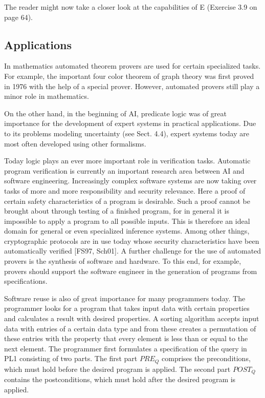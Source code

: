 \documentclass[10pt]{article}
\begin{document}
The reader might now take a closer look at the capabilities of E (Exercise 3.9 on page 64).

\subsection*{Applications}
In mathematics automated theorem provers are used for certain specialized tasks. For example, the important four color theorem of graph theory was first proved in 1976 with the help of a special prover. However, automated provers still play a minor role in mathematics.

On the other hand, in the beginning of AI, predicate logic was of great importance for the development of expert systems in practical applications. Due to its problems modeling uncertainty (see Sect. 4.4), expert systems today are most often developed using other formalisms.

Today logic plays an ever more important role in verification tasks. Automatic program verification is currently an important research area between AI and software engineering. Increasingly complex software systems are now taking over tasks of more and more responsibility and security relevance. Here a proof of certain safety characteristics of a program is desirable. Such a proof cannot be brought about through testing of a finished program, for in general it is impossible to apply a program to all possible inputs. This is therefore an ideal domain for general or even specialized inference systems. Among other things, cryptographic protocols are in use today whose security characteristics have been automatically verified [FS97, Sch01]. A further challenge for the use of automated provers is the synthesis of software and hardware. To this end, for example, provers should support the software engineer in the generation of programs from specifications.

Software reuse is also of great importance for many programmers today. The programmer looks for a program that takes input data with certain properties and calculates a result with desired properties. A sorting algorithm accepts input data with entries of a certain data type and from these creates a permutation of these entries with the property that every element is less than or equal to the next element. The programmer first formulates a specification of the query in PL1 consisting of two parts. The first part $P R E_{Q}$ comprises the preconditions, which must hold before the desired program is applied. The second part $P O S T_{Q}$ contains the postconditions, which must hold after the desired program is applied.
\end{document}
